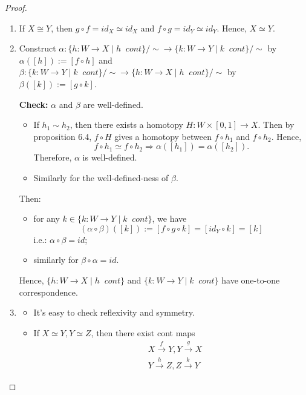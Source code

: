 \begin{proof}
    \begin{enumerate}
        \item If $X \cong Y$, then $g \circ f = id_X \simeq id_X$ and $f \circ g = id_Y \simeq id_Y$. Hence, $X \simeq Y$.
        \item Construct $\alpha : \{ h: W \rightarrow X \mid h\;\;cont\}/\sim \rightarrow \{k: W \rightarrow Y \mid k\;\;cont\}/\sim$ by $\alpha ([h]) := [f\circ h]$ and $\beta : \{k: W \rightarrow Y \mid k\;\;cont\}/\sim \rightarrow \{ h: W \rightarrow X \mid h\;\;cont\}/\sim$ by $\beta([k]) := [g \circ k]$.

        \textbf{Check:} $\alpha$ and $\beta$ are well-defined.
        \begin{itemize}
            \item If $h_1 \sim h_2$, then there exists a homotopy $H : W \times [0,1] \rightarrow X$. Then by proposition 6.4, $f \circ H$ gives a homotopy between $f \circ h_1$ and $f \circ h_2$. Hence, 
            $$f \circ h_1 \simeq f \circ h_2 \Rightarrow \alpha ([h_1]) = \alpha([h_2]).$$
            Therefore, $\alpha$ is well-defined.
            \item Similarly for the well-defined-ness of $\beta$.
        \end{itemize}
        Then:
        \begin{itemize}
            \item for any $k \in \{k: W \rightarrow Y \mid k\;\;cont\}$, we have
            $$(\alpha \circ \beta) ([k]) := [f \circ g \circ k] = [id_{Y} \circ k] = [k]$$
            i.e.: $\alpha \circ \beta = id$;
            \item similarly for $\beta \circ \alpha = id$.
        \end{itemize}
        Hence, $\{ h: W \rightarrow X \mid h\;\;cont\}$ and $\{ k: W \rightarrow Y \mid k\;\;cont\}$ have one-to-one correspondence.
        \item \begin{itemize}
            \item It's easy to check reflexivity and symmetry.
            \item If $X \simeq Y,Y\simeq Z$, then there exist cont maps
            \begin{align*}
                &X \overset{f}{\rightarrow}Y, Y \overset{g}{\rightarrow}X\\
                &Y \overset{h}{\rightarrow}Z,Z \overset{k}{\rightarrow}Y
            \end{align*}

\end{itemize}
\end{enumerate}
\end{proof}
